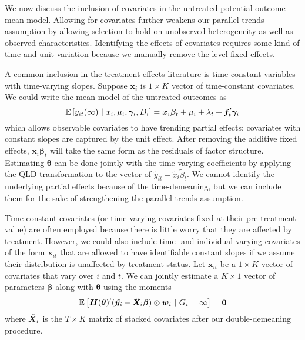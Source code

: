 \documentclass[12pt]{article}
\begin{document}

We now discuss the inclusion of covariates in the untreated potential outcome mean model. Allowing for covariates further weakens our parallel trends assumption by allowing selection to hold on unobserved heterogeneity as well as observed characteristics. Identifying the effects of covariates requires some kind of time and unit variation because we manually remove the level fixed effects. 

A common inclusion in the treatment effects literature is time-constant variables with time-varying slopes. Suppose $\bm x_i$ is $1 \times K$ vector of time-constant covariates. We could write the mean model of the untreated outcomes as 
\begin{equation}
    \mathbb{E}\left[y_{it}(\infty) \ \vert \ x_i, \mu_i, \bm \gamma_i, D_i\right] = \bm x_i \bm \beta_t + \mu_i + \lambda_t + \bm f_t' \bm \gamma_i
\end{equation}
which allows observable covariates to have trending partial effects; covariates with constant slopes are captured by the unit effect. After removing the additive fixed effects, $\bm x_i \bm \beta_t$ will take the same form as the residuals of factor structure. Estimating $\bm \theta$ can be done jointly with the time-varying coefficients by applying the QLD transformation to the vector of $\tilde{y}_{it} - \tilde{x}_i \tilde{\beta}_t$. We cannot identify the underlying partial effects because of the time-demeaning, but we can include them for the sake of strengthening the parallel trends assumption.

Time-constant covariates (or time-varying covariates fixed at their pre-treatment value) are often employed because there is little worry that they are affected by treatment. However, we could also include time- and individual-varying covariates of the form $\bm x_{it}$ that are allowed to have identifiable constant slopes if we assume their distribution is unaffected by treatment status. Let $\bm x_{it}$ be a $1 \times K$ vector of covariates that vary over $i$ and $t$. We can jointly estimate a $K \times 1$ vector of parameters $\bm \beta$ along with $\bm \theta$ using the moments
\begin{equation}
    \mathbb{E}\left[\bm H(\bm \theta)' (\tilde{\bm y_i} - \tilde{\bm X_i} \bm \beta) \otimes \bm w_i \ \vert \ G_i = \infty\right] = \bm 0
\end{equation}
where $\Tilde{\bm X}_i$ is the $T \times K$ matrix of stacked covariates after our double-demeaning procedure.
\end{document}
